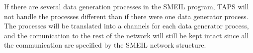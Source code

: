 

If there are several data generation processes in the SMEIL program, TAPS will not handle the processes different than if there were one data generator process. The processes will be translated into a \cspm channels for each data generator process, and the comunication to the rest of the network will still be kept intact since all the communication are specified by the SMEIL network structure.


%



